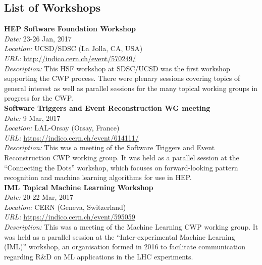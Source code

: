 \documentclass[12pt,a4paper]{article}
\begin{document}
\newpage
\begin{appendices}

\hypertarget{appendix-a---list-of-workshops}{%
\section{List of Workshops}\label{appendix-a---list-of-workshops}}

\textbf{HEP Software Foundation Workshop}\\
\emph{Date:} 23-26 Jan, 2017\\
\emph{Location:} UCSD/SDSC (La Jolla, CA, USA)\\
\emph{URL:}
\href{http://indico.cern.ch/event/570249/}{{http://indico.cern.ch/event/570249/}}\\
\emph{Description:} This HSF workshop at SDSC/UCSD was the first
workshop supporting the CWP process. There were plenary sessions
covering topics of general interest as well as parallel sessions for the
many topical working groups in progress for the CWP.\\

\noindent
\textbf{Software Triggers and Event Reconstruction WG meeting}\\
\emph{Date:} 9 Mar, 2017\\
\emph{Location:} LAL-Orsay (Orsay, France)\\
\emph{URL:}
\href{https://indico.cern.ch/event/614111/}{{https://indico.cern.ch/event/614111/}}\\
\emph{Description:} This was a meeting of the Software Triggers and Event
Reconstruction CWP working group. It was held as a parallel session at
the ``Connecting the Dots'' workshop, which focuses on forward-looking
pattern recognition and machine learning algorithms for use in HEP.\\

\noindent
\textbf{IML Topical Machine Learning Workshop}\\
\emph{Date:} 20-22 Mar, 2017\\
\emph{Location:} CERN (Geneva, Switzerland)\\
\emph{URL:}
\href{https://indico.cern.ch/event/595059}{{https://indico.cern.ch/event/595059}}\\
\emph{Description:} This was a meeting of the Machine Learning CWP
working group. It was held as a parallel session at the
``Inter-experimental Machine Learning (IML)'' workshop, an organisation
formed in 2016 to facilitate communication regarding R\&D on ML
applications in the LHC experiments.\\


\end{appendices}
\end{document}
